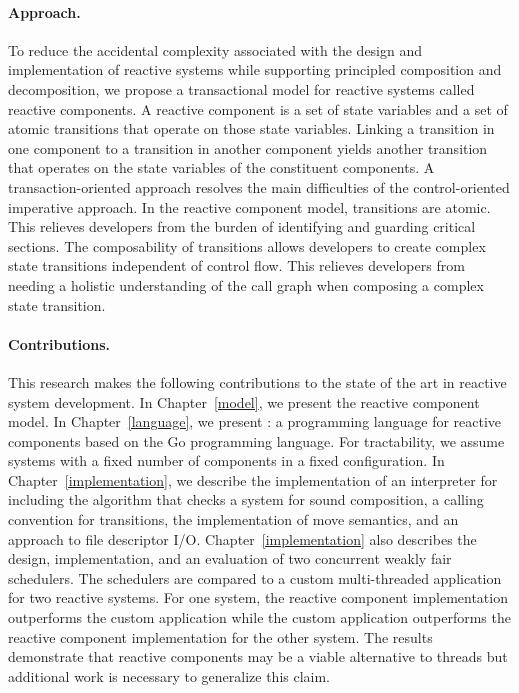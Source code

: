 \paragraph{Approach.}
To reduce the accidental complexity associated with the design and implementation of reactive systems while supporting principled composition and decomposition, we propose a transactional model for reactive systems called reactive components.
A reactive component is a set of state variables and a set of atomic transitions that operate on those state variables.
Linking a transition in one component to a transition in another component yields another transition that operates on the state variables of the constituent components.
A transaction-oriented approach resolves the main difficulties of the control-oriented imperative approach.
In the reactive component model, transitions are atomic.
This relieves developers from the burden of identifying and guarding critical sections.
The composability of transitions allows developers to create complex state transitions independent of control flow.
This relieves developers from needing a holistic understanding of the call graph when composing a complex state transition.

\paragraph{Contributions.}
This research makes the following contributions to the state of the art in reactive system development.
In Chapter~\ref{model}, we present the reactive component model.
In Chapter~\ref{language}, we present \rcgo{}:  a programming language for reactive components based on the Go programming language.
For tractability, we assume systems with a fixed number of components in a fixed configuration.
In Chapter~\ref{implementation}, we describe the implementation of an interpreter for \rcgo{} including the algorithm that checks a system for sound composition, a calling convention for transitions, the implementation of move semantics, and an approach to file descriptor I/O.
Chapter~\ref{implementation} also describes the design, implementation, and an evaluation of two concurrent weakly fair schedulers.
The schedulers are compared to a custom multi-threaded application for two reactive systems.
For one system, the reactive component implementation outperforms the custom application while the custom application outperforms the reactive component implementation for the other system.
The results demonstrate that reactive components may be a viable alternative to threads but additional work is necessary to generalize this claim.
